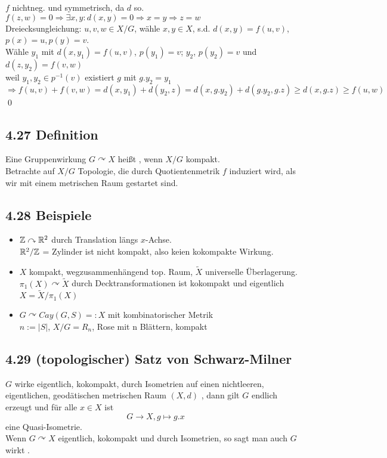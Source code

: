 \documentclass{article}
\begin{document}
$f$ nichtneg. und symmetrisch, da $d$ so.\\
$f(z,w) = 0 \Longrightarrow \exists x,y: d(x,y) = 0 \Longrightarrow x = y \Longrightarrow z = w$\\
Dreiecksungleichung: $u,v,w \in X/G$, wähle $x, y \in X$, s.d. $d(x,y) = f(u,v)$, $p(x) = u, p(y) = v$.\\
Wähle $y_1$ mit $d(x,y_1) = f(u,v)$, $p(y_1) = v$; $y_2$, $p(y_2) = v$ und $d(z,y_2) = f(v,w)$\\
weil $y_1, y_2 \in p^{-1}(v)$ existiert $g$ mit $g.y_2 =y_1$\\
$\Longrightarrow f(u,v) + f(v,w) = d(x,y_1)+d(y_2,z) = d(x,g.y_2) + d(g.y_2, g.z) \geq d(x,g.z) \geq f(u,w)$
\qed


\subsection{4.27 Definition}
Eine Gruppenwirkung $G\curvearrowright X$ heißt , wenn $X/G$ kompakt.\\
Betrachte auf $X/G$ Topologie, die durch Quotientenmetrik $f$ induziert wird, als wir mit einem metrischen Raum gestartet sind.

\subsection{4.28 Beispiele}
\begin{itemize}
	\item $\mathbb{Z} \curvearrowright \mathbb{R}^2$ durch Translation längs $x$-Achse.\\
	$\mathbb{R}^2/\mathbb{Z}$ = Zylinder ist nicht kompakt, also keien kokompakte Wirkung.
	
	\item $X$ kompakt, wegzusammenhängend top. Raum, $\widetilde{X}$ universelle Überlagerung.\\
	$\pi_1(X) \curvearrowright \widetilde{X}$ durch Decktransformationen ist kokompakt und eigentlich\\
	$X = \widetilde{X}/ \pi_1(X)$
	
	\item $G \curvearrowright Cay(G,S) =: X$ mit kombinatorischer Metrik\\
	$n := |S|$, $X/G = R_n$, Rose mit n Blättern, kompakt
\end{itemize}

\subsection{4.29 (topologischer) Satz von Schwarz-Milner}
$G$ wirke eigentlich, kokompakt, durch Isometrien auf einen nichtleeren, eigentlichen, geodätischen metrischen Raum $(X,d)$
, dann gilt $G$ endlich erzeugt und für alle $x \in X$ ist
\[G \longrightarrow X, g \longmapsto g.x\]
eine Quasi-Isometrie.\\
Wenn $G\curvearrowright X$ eigentlich, kokompakt und durch Isometrien, so sagt man auch $G$ wirkt .
\end{document}
